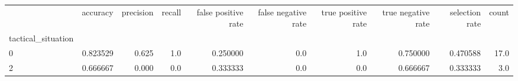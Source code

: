 \begin{tabular}{lrrrrrrrrr}
\toprule
{} &  accuracy &  precision &  recall &  false positive rate &  false negative rate &  true positive rate &  true negative rate &  selection rate &  count \\
tactical\_situation &           &            &         &                      &                      &                     &                     &                 &        \\
\midrule
0                  &  0.823529 &      0.625 &     1.0 &             0.250000 &                  0.0 &                 1.0 &            0.750000 &        0.470588 &   17.0 \\
2                  &  0.666667 &      0.000 &     0.0 &             0.333333 &                  0.0 &                 0.0 &            0.666667 &        0.333333 &    3.0 \\
\bottomrule
\end{tabular}
